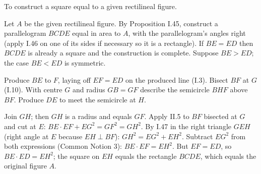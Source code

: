 \begin{claim}
\label{prop:II.14}
To construct a square equal to a given rectilineal figure.
\end{claim}
\begin{evidence}[Proof of II.14]
\label{ev:II.14}

Let $A$ be the given rectilineal figure.  By Proposition I.45,
construct a parallelogram $BCDE$ equal in area to $A$, with the
parallelogram's angles right (apply I.46 on one of its sides if
necessary so it is a rectangle).  If $BE = ED$ then $BCDE$ is
already a square and the construction is complete.  Suppose
$BE > ED$; the case $BE < ED$ is symmetric.

Produce $BE$ to $F$, laying off $EF = ED$ on the produced line
(I.3).  Bisect $BF$ at $G$ (I.10).  With centre $G$ and radius
$GB = GF$ describe the semicircle $BHF$ above $BF$.  Produce $DE$
to meet the semicircle at $H$.

Join $GH$; then $GH$ is a radius and equals $GF$.  Apply II.5 to
$BF$ bisected at $G$ and cut at $E$: $BE \cdot EF + EG^2 = GF^2 =
GH^2$.  By I.47 in the right triangle $GEH$ (right angle at $E$
because $EH \perp BF$): $GH^2 = EG^2 + EH^2$.  Subtract $EG^2$
from both expressions (Common Notion 3): $BE \cdot EF = EH^2$.
But $EF = ED$, so $BE \cdot ED = EH^2$; the square on $EH$ equals
the rectangle $BCDE$, which equals the original figure $A$.
\end{evidence}
